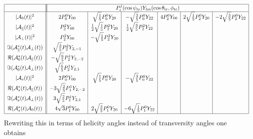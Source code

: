 \documentclass[a4paper,9pt,twosided]{article}
\def\thetatr{\theta_\mathrm{tr}}
\def\phitr{\phi_\mathrm{tr}}
\def\psitr{\psi_\mathrm{tr}}
\begin{document}
\begin{equation}\label{tab:pdfinpy}
\begin{array}{|c|| c | c | c | c | c | c |}
 \hline
&\multicolumn{6}{|c|}{ P_i^j(\cos\psitr)Y_{lm}(\cos\thetatr,\phitr) } \\
 \hline
|{\cal A}_0(t)|^2                       &  2 P_0^0Y_{00}  & \sqrt{\frac{1}{5}} P_0^0 Y_{20} & - \sqrt{\frac{3}{5}} P_0^0 Y_{22}
                                        &  4 P_2^0Y_{00}  & 2 \sqrt{\frac{1}{5}} P_2^0 Y_{20} & -2 \sqrt{\frac{3}{5}} P_2^0 Y_{22} \\
|{\cal A}_\parallel(t)|^2               &    P_2^2Y_{00} &  \frac{1}{2}\sqrt{\frac{1}{5}} P_2^2 Y_{20} & \frac{1}{2}\sqrt{\frac{3}{5}} P_2^2Y_{22} & && \\
|{\cal A}_\perp(t)|^2                   &  P_2^2 Y_{00} & -\sqrt{\frac{1}{5}} P_2^2 Y_{20} &                                 &&& \\
\Im({\cal A}_\parallel^*(t){\cal A}_\perp(t)) &  \sqrt{\frac{3}{5}} P_2^2 Y_{2,-1} &&&&&\\
\Re({\cal A}_0^*(t){\cal A}_\parallel(t))     & -\sqrt{\frac{6}{5}} P_2^1 Y_{2,-2} &&&&&\\
\Im({\cal A}_0^*(t){\cal A}_\perp(t))         &  \sqrt{\frac{6}{5}} P_2^1 Y_{2,1} &&&&&\\
|{\cal A}_{s}(t)|^2                   &  2 P_0^0 Y_{00} & \sqrt{\frac{1}{5}} P_0^0 Y_{20} & -\sqrt{\frac{3}{5}} P_0^0 Y_{22}                                &&& \\
\Re({\cal A}_{s}^*(t){\cal A}_\parallel(t))   &  -3\sqrt{\frac{2}{5}} P_1^1 Y_{2,-2} &&&&& \\
\Im({\cal A}_{s}^*(t){\cal A}_\perp(t))     &  3\sqrt{\frac{2}{5}} P_1^1 Y_{2,1} &&&&& \\
\Re({\cal A}_{s}^*(t){\cal A}_0(t))   &  4 \sqrt{3} P_1^0 Y_{00} & 2 \sqrt{\frac{3}{5}} P_1^0 Y_{20} & - 6 \sqrt{\frac{1}{5}} P_1^0 Y_{22}                       &&& \\
 \hline
\end{array}
\end{equation}
Rewriting this in terms of helicity angles instead of transversity angles one obtains
\end{document}
